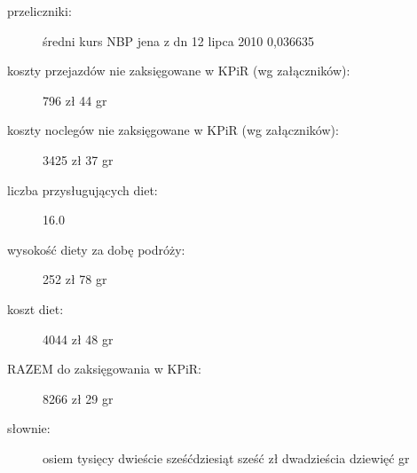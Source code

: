 \begin{description}
\item[przeliczniki:] średni kurs NBP jena z dn 12 lipca 2010 0,036635
\item[koszty przejazdów nie zaksięgowane w KPiR (wg załączników):] 796 zł 44 gr
\item[koszty noclegów nie zaksięgowane w KPiR (wg załączników):] 3425 zł 37 gr
\item[liczba przysługujących diet:] 16.0
\item[wysokość diety za dobę podróży:] 252 zł 78 gr
\item[koszt diet:] 4044 zł 48 gr 
\item[RAZEM do zaksięgowania w KPiR:] 8266 zł 29 gr
\item[słownie:] osiem tysięcy dwieście sześćdziesiąt sześć zł dwadzieścia dziewięć gr
\end{description}